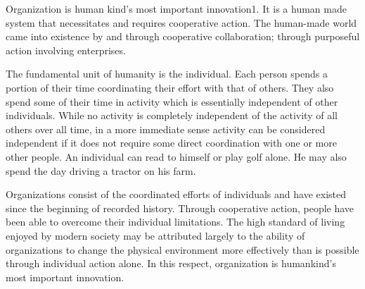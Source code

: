 Organization is human kind’s most important innovation1. It is a human made system that necessitates and requires cooperative action. The human-made world came into existence by and through cooperative collaboration; through purposeful action involving enterprises.

The fundamental unit of humanity is the individual. Each person spends a portion of their time coordinating their effort with that of others. They also spend some of their time in activity which is essentially independent of other individuals. While no activity is completely independent of the activity of all others over all time, in a more immediate sense activity can be considered independent if it does not require some direct coordination with one or more other people. An individual can read to himself or play golf alone. He may also spend the day driving a tractor on his farm.

Organizations consist of the coordinated efforts of individuals and have existed since the beginning of recorded history. Through cooperative action, people have been able to overcome their individual limitations. The high standard of living enjoyed by modern society may be attributed largely to the ability of organizations to change the physical environment more effectively than is possible through individual action alone. In this respect, organization is humankind’s most important innovation.